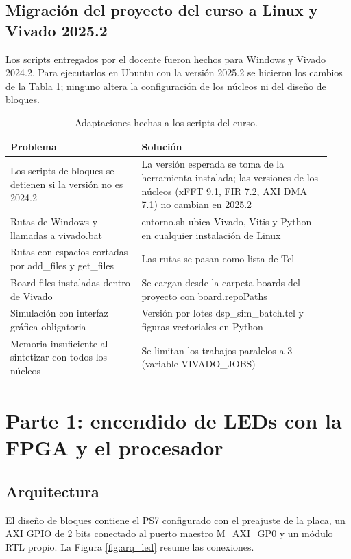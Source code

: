 \documentclass[11pt,a4paper]{article}
\begin{document}
\subsection{Migración del proyecto del curso a Linux y Vivado 2025.2}
Los scripts entregados por el docente fueron hechos para Windows y Vivado 2024.2. Para ejecutarlos en Ubuntu con la versión 2025.2 se hicieron los cambios de la Tabla \ref{tab:migracion}; ninguno altera la configuración de los núcleos ni del diseño de bloques.
\begin{table}[H]\centering
\caption{Adaptaciones hechas a los scripts del curso.}
\label{tab:migracion}
\begin{tabular}{p{0.38\linewidth}p{0.55\linewidth}}\toprule
Problema & Solución\\\midrule
Los scripts de bloques se detienen si la versión no es 2024.2 & La versión esperada se toma de la herramienta instalada; las versiones de los núcleos (xFFT 9.1, FIR 7.2, AXI DMA 7.1) no cambian en 2025.2\\
Rutas de Windows y llamadas a vivado.bat & entorno.sh ubica Vivado, Vitis y Python en cualquier instalación de Linux\\
Rutas con espacios cortadas por add\_files y get\_files & Las rutas se pasan como lista de Tcl\\
Board files instaladas dentro de Vivado & Se cargan desde la carpeta boards del proyecto con board.repoPaths\\
Simulación con interfaz gráfica obligatoria & Versión por lotes dsp\_sim\_batch.tcl y figuras vectoriales en Python\\
Memoria insuficiente al sintetizar con todos los núcleos & Se limitan los trabajos paralelos a 3 (variable VIVADO\_JOBS)\\\bottomrule
\end{tabular}
\end{table}

\section{Parte 1: encendido de LEDs con la FPGA y el procesador}
\subsection{Arquitectura}
El diseño de bloques contiene el PS7 configurado con el preajuste de la placa, un AXI GPIO de 2 bits conectado al puerto maestro M\_AXI\_GP0 y un módulo RTL propio. La Figura \ref{fig:arq_led} resume las conexiones.
\end{document}

